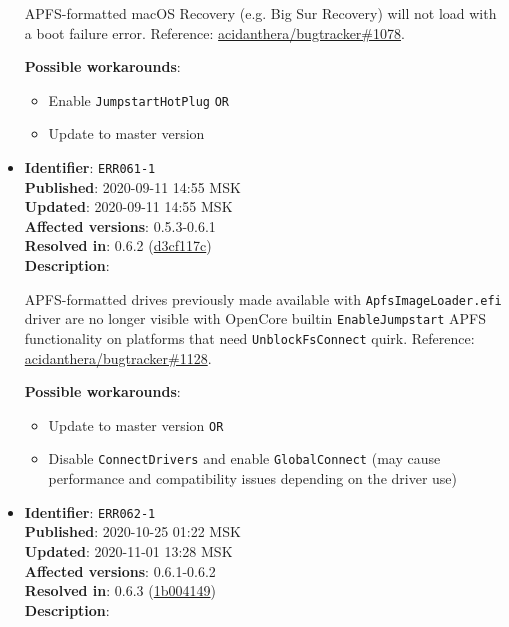 \documentclass[]{article}
\providecommand{\tightlist}{%
  \setlength{\itemsep}{0pt}\setlength{\parskip}{0pt}}
\begin{document}
\begin{itemize}
  APFS-formatted macOS Recovery (e.g. Big Sur Recovery) will not load with a boot failure error. Reference:
  \href{https://github.com/acidanthera/bugtracker/issues/1078}{acidanthera/bugtracker\#1078}.

  \textbf{Possible workarounds}:
  \begin{itemize}
    \tightlist

    \item Enable \texttt{JumpstartHotPlug} \texttt{OR}
    \item Update to master version
  \end{itemize}

\item
  \textbf{Identifier}: \texttt{ERR061-1} \\
  \textbf{Published}: 2020-09-11 14:55 MSK \\
  \textbf{Updated}: 2020-09-11 14:55 MSK \\
  \textbf{Affected versions}: 0.5.3-0.6.1 \\
  \textbf{Resolved in}: 0.6.2 (\href{https://github.com/acidanthera/OpenCorePkg/commit/d3cf117c8661a4eda1863ca1fcdfae5c277974db}{d3cf117c}) \\
  \textbf{Description}:

  APFS-formatted drives previously made available with \texttt{ApfsImageLoader.efi}
  driver are no longer visible with OpenCore builtin \texttt{EnableJumpstart} APFS
  functionality on platforms that need \texttt{UnblockFsConnect} quirk. Reference:
  \href{https://github.com/acidanthera/bugtracker/issues/1128}{acidanthera/bugtracker\#1128}.

  \textbf{Possible workarounds}:
  \begin{itemize}
    \tightlist

    \item Update to master version \texttt{OR}
    \item Disable \texttt{ConnectDrivers} and enable \texttt{GlobalConnect} (may cause
      performance and compatibility issues depending on the driver use)

  \end{itemize}

\item
  \textbf{Identifier}: \texttt{ERR062-1} \\
  \textbf{Published}: 2020-10-25 01:22 MSK \\
  \textbf{Updated}: 2020-11-01 13:28 MSK \\
  \textbf{Affected versions}: 0.6.1-0.6.2 \\
  \textbf{Resolved in}: 0.6.3 (\href{https://github.com/acidanthera/OpenCorePkg/commit/1b0041493d4693f9505aa6415d93079ea59f7ab0}{1b004149}) \\
  \textbf{Description}:


\end{itemize}
\end{document}
